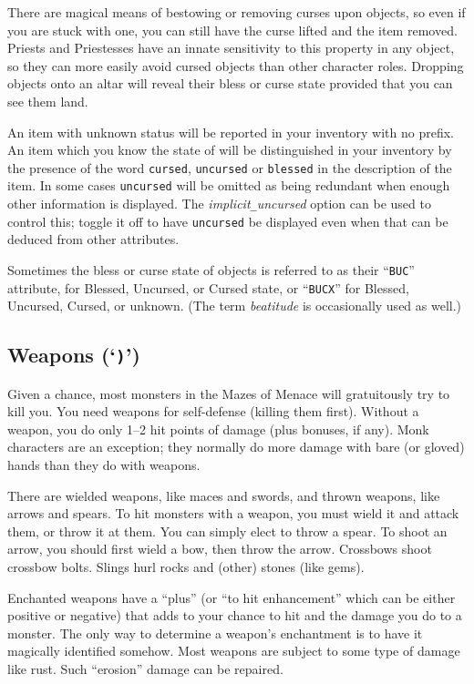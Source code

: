 There are magical means of bestowing or removing curses upon objects,
so even if you are stuck with one, you can still have the curse
lifted and the item removed.
Priests and Priestesses have an innate
sensitivity to this property in any object, so they can more easily avoid
cursed objects than other character roles.
Dropping objects onto an altar will reveal their bless or curse state
provided that you can see them land.

An item with unknown status will be reported in your inventory with no prefix.
An item which you know the state of will be distinguished in your inventory
by the presence of the word {\tt cursed}, {\tt uncursed} or
{\tt blessed} in the description of the item.
In some cases {\tt uncursed} will be omitted as being redundant when
enough other information is displayed.
The
{\it implicit\verb+_+uncursed\/}
option can be used to control this; toggle it off to have {\tt uncursed}
be displayed even when that can be deduced from other attributes.

Sometimes the bless or curse state of objects is referred to as their
``{\tt BUC}'' attribute, for Blessed, Uncursed, or Cursed state,
or ``{\tt BUCX}'' for Blessed, Uncursed, Cursed, or unknown.
(The term {\it beatitude\/} is occasionally used as well.)

\subsection*{Weapons (`{\tt )}')}

Given a chance, most monsters in the Mazes of Menace will gratuitously try to
kill you.
You need weapons for self-defense (killing them first).
Without a
weapon, you do only 1--2 hit points of damage (plus bonuses, if any).
Monk characters are an exception; they normally do more damage with
bare (or gloved) hands than they do with weapons.

There are wielded weapons, like maces and swords, and thrown weapons,
like arrows and spears.  To hit monsters with a weapon, you must wield it and
attack them, or throw it at them.  You can simply elect to throw a spear.
To shoot an arrow, you should first wield a bow, then throw the arrow.
Crossbows shoot crossbow bolts.  Slings hurl rocks and (other) stones
(like gems).

Enchanted weapons have a ``plus'' (or ``to hit enhancement'' which can be
either positive or negative) that adds to your chance to
hit and the damage you do to a monster.  The only way to determine a weapon's
enchantment is to have it magically identified somehow.
Most weapons are subject to some type of damage like rust.  Such
``erosion'' damage can be repaired.

